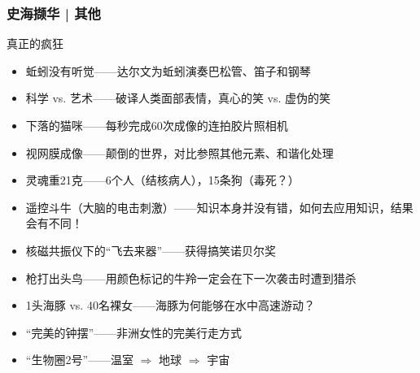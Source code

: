 \begin{frame}
  \frametitle{史海撷华 | 其他}
  \begin{block}{真正的疯狂}
    \begin{itemize}
      \item 蚯蚓没有听觉——达尔文为蚯蚓演奏巴松管、笛子和钢琴
      \item 科学 vs. 艺术——破译人类面部表情，真心的笑 vs. 虚伪的笑
      \item 下落的猫咪——每秒完成60次成像的连拍胶片照相机
      \item 视网膜成像——颠倒的世界，对比参照其他元素、和谐化处理
      \item 灵魂重21克——6个人（结核病人），15条狗（毒死？）
      \item 遥控斗牛（大脑的电击刺激）——知识本身并没有错，如何去应用知识，结果会有不同！
      \item 核磁共振仪下的“飞去来器”——获得搞笑诺贝尔奖
      \item 枪打出头鸟——用颜色标记的牛羚一定会在下一次袭击时遭到猎杀
      \item 1头海豚 vs. 40名裸女——海豚为何能够在水中高速游动？
      \item “完美的钟摆”——非洲女性的完美行走方式
      \item “生物圈2号”——温室 $\Longrightarrow$ 地球 $\Longrightarrow$ 宇宙
    \end{itemize}
  \end{block}
\end{frame}



